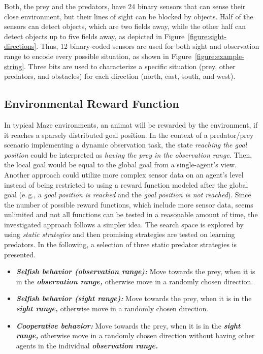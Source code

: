 \documentclass{sig-alternate}
\begin{document}
Both, the prey and the predators, have 24 binary sensors that can sense their close environment, but their lines of sight can be blocked by objects. Half of the sensors can detect objects, which are two fields away, while the other half can detect objects up to five fields away, as depicted in Figure~\ref{figure:sight-directions}. %
Thus, 12 binary-coded sensors are used for both sight and observation range to encode every possible situation, as shown in Figure~\ref{figure:example-string}. Three bits are used to characterize a specific situation (prey, other predators, and obstacles) for each direction (north, east, south, and west). 

\subsection{Environmental Reward Function}
\label{subsection:environment-reward-function}

In typical Maze environments, an animat will be rewarded by the environment, if it reaches a sparsely distributed goal position. In the context of a predator/prey scenario implementing a dynamic observation task, the state \emph{reaching the goal position} could be interpreted as \emph{having the prey in the observation range}. Then, the local goal would be equal to the global goal from a single-agent's view. Another approach could utilize more complex sensor data on an agent's level instead of being restricted to using a reward function modeled after the global goal (e.\,g., a \emph{goal position is reached} and the \emph{goal position is not reached}). Since the number of possible reward functions, which include more sensor data, seems unlimited and not all functions can be tested in a reasonable amount of time, the investigated approach follows a simpler idea. The search space is explored by using \emph{static strategies} and then promising strategies are tested on learning predators. In the following, a selection of three static predator strategies is presented. 

\begin{itemize}
	\item \emph{\textbf{Selfish behavior (observation range):}} Move towards the prey, when it is in the \emph{\textbf{observation range,}} otherwise move in a randomly chosen direction.
	\item \emph{\textbf{Selfish behavior (sight range):}} Move towards the prey, when it is in the \emph{\textbf{sight range,}} otherwise move in a randomly chosen direction.
	\item \emph{\textbf{Cooperative behavior:}} Move towards the prey, when it is in the \emph{\textbf{sight range,}} otherwise move in a randomly chosen direction without having other agents in the individual \emph{\textbf{observation range.}}
\end{itemize}
\end{document}
